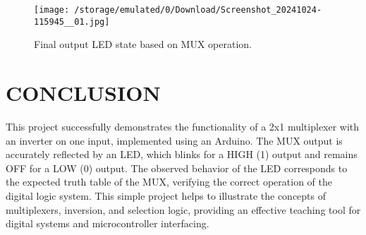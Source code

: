 \documentclass[conference]{IEEEtran}
\begin{document}
\begin{figure}[h] 
	\centering 
	\texttt{[image: /storage/emulated/0/Download/Screenshot\_20241024-115945\_\_01.jpg]}
	\caption{\label{fig:output} Final output LED state based on MUX operation.}    
\end{figure}

\section{CONCLUSION}
This project successfully demonstrates the functionality of a 2x1 multiplexer with an inverter on one input, implemented using an Arduino. The MUX output is accurately reflected by an LED, which blinks for a HIGH (1) output and remains OFF for a LOW (0) output. The observed behavior of the LED corresponds to the expected truth table of the MUX, verifying the correct operation of the digital logic system. This simple project helps to illustrate the concepts of multiplexers, inversion, and selection logic, providing an effective teaching tool for digital systems and microcontroller interfacing.
\end{document}
